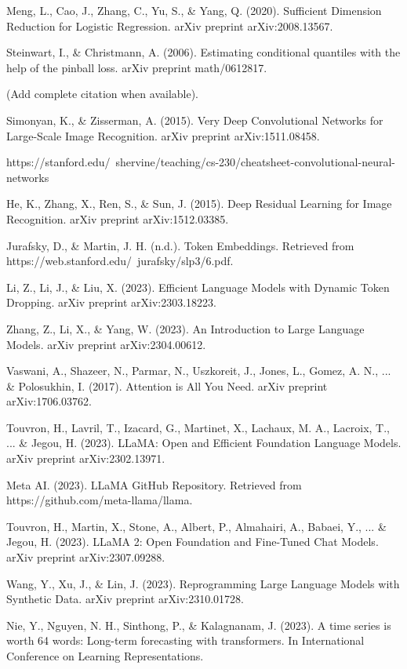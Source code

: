 \begin{thebibliography}{99}
	 Meng, L., Cao, J., Zhang, C., Yu, S., \& Yang, Q. (2020). Sufficient Dimension Reduction for Logistic Regression. arXiv preprint arXiv:2008.13567.

	 Steinwart, I., \& Christmann, A. (2006). Estimating conditional quantiles with the help of the pinball loss. arXiv preprint math/0612817.

	 (Add complete citation when available).

	 Simonyan, K., \& Zisserman, A. (2015). Very Deep Convolutional Networks for Large-Scale Image Recognition. arXiv preprint arXiv:1511.08458.

	 https://stanford.edu/~shervine/teaching/cs-230/cheatsheet-convolutional-neural-networks

	 He, K., Zhang, X., Ren, S., \& Sun, J. (2015). Deep Residual Learning for Image Recognition. arXiv preprint arXiv:1512.03385.

	 Jurafsky, D., \& Martin, J. H. (n.d.). Token Embeddings. Retrieved from https://web.stanford.edu/~jurafsky/slp3/6.pdf.

	 Li, Z., Li, J., \& Liu, X. (2023). Efficient Language Models with Dynamic Token Dropping. arXiv preprint arXiv:2303.18223.

	 Zhang, Z., Li, X., \& Yang, W. (2023). An Introduction to Large Language Models. arXiv preprint arXiv:2304.00612.

	 Vaswani, A., Shazeer, N., Parmar, N., Uszkoreit, J., Jones, L., Gomez, A. N., ... \& Polosukhin, I. (2017). Attention is All You Need. arXiv preprint arXiv:1706.03762.

	 Touvron, H., Lavril, T., Izacard, G., Martinet, X., Lachaux, M. A., Lacroix, T., ... \& Jegou, H. (2023). LLaMA: Open and Efficient Foundation Language Models. arXiv preprint arXiv:2302.13971.

	 Meta AI. (2023). LLaMA GitHub Repository. Retrieved from https://github.com/meta-llama/llama.

	 Touvron, H., Martin, X., Stone, A., Albert, P., Almahairi, A., Babaei, Y., ... \& Jegou, H. (2023). LLaMA 2: Open Foundation and Fine-Tuned Chat Models. arXiv preprint arXiv:2307.09288.

	 Wang, Y., Xu, J., \& Lin, J. (2023). Reprogramming Large Language Models with Synthetic Data. arXiv preprint arXiv:2310.01728.

	 Nie, Y., Nguyen, N. H., Sinthong, P., \& Kalagnanam, J. (2023). A time series is worth 64 words: Long-term forecasting with transformers. In International Conference on Learning Representations.

\end{thebibliography}
